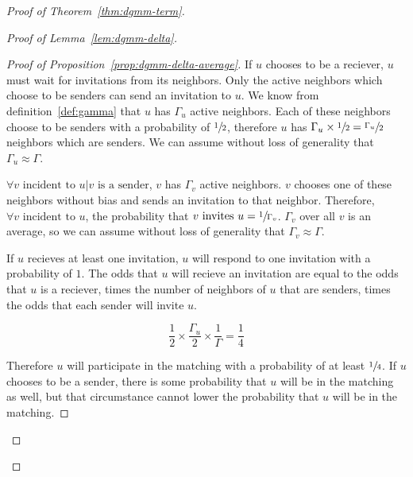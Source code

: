 \begin{proof}[Proof of Theorem~\ref{thm:dgmm-term}]
\begin{proof}[Proof of Lemma~\ref{lem:dgmm-delta}]
\begin{proof}[Proof of Proposition~\ref{prop:dgmm-delta-average}]
If $u$ chooses to be a reciever, $u$ must wait for invitations from its neighbors. Only the active neighbors which choose to be senders can send an invitation to $u$. We know from definition~\ref{def:gamma} that $u$ has $\Gamma_u$ active neighbors. Each of these neighbors choose to be senders with a probability of $\sfrac{1}{2}$, therefore $u$ has $\Gamma_u \times \sfrac{1}{2} = \sfrac{\Gamma_u}{2}$ neighbors which are senders. We can assume without loss of generality that $\Gamma_u \approx \Gamma$.

$\forall v \text{ incident to } u | v \text{ is a sender}$, $v$ has $\Gamma_v$ active neighbors. $v$ chooses one of these neighbors without bias and sends an invitation to that neighbor. Therefore, $\forall v \text{ incident to } u$, the probability that $v \text{ invites } u = \sfrac{1}{\Gamma_v}$. $\Gamma_v$ over all $v$ is an average, so we can assume without loss of generality that $\Gamma_v \approx \Gamma$.

If $u$ recieves at least one invitation, $u$ will respond to one invitation with a probability of $1$. The odds that $u$ will recieve an invitation are equal to the odds that $u$ is a reciever, times the number of neighbors of $u$ that are senders, times the odds that each sender will invite $u$.

\begin{equation*}
\frac{1}{2} \times \frac{\Gamma_u}{2} \times \frac{1}{\Gamma} = \frac{1}{4}
\end{equation*}

Therefore $u$ will participate in the matching with a probability of at least $\sfrac{1}{4}$. If $u$ chooses to be a sender, there is some probability that $u$ will be in the matching as well, but that circumstance cannot lower the probability that $u$ will be in the matching.


\end{proof}
\end{proof}
\end{proof}
